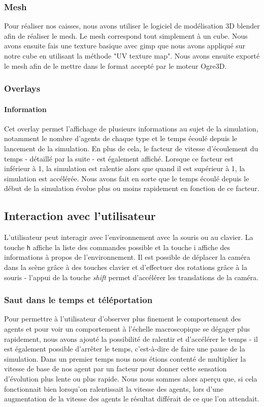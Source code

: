 \subsubsection{Mesh}
Pour réaliser nos caisses, nous avons utiliser le logiciel de modélisation 3D
blender afin de réaliser le mesh. Le mesh correspond tout simplement à un
cube. Nous avons ensuite fais une texture basique avec gimp que nous avons
appliqué sur notre cube en utilisant la méthode "UV texture map".
Nous avons ensuite exporté le mesh afin de le mettre dans le format
accepté par le moteur Ogre3D.


\subsubsection{Overlays}

\paragraph{Information}
Cet overlay permet l'affichage de plusieurs informations au sujet de la
simulation, notamment le nombre d'agents de chaque type et le temps écoulé
depuis le lancement de la simulation.
En plus de cela, le facteur de vitesse d'écoulement du temps - détaillé par la
suite - est également affiché. Lorsque ce facteur est inférieur à 1, la
simulation est ralentie alors que quand il est supérieur à 1, la simulation
est accélérée. Nous avons fait en sorte que le temps écoulé depuis le début de
la simulation évolue plus ou moins rapidement en fonction de ce facteur.

\subsection{Interaction avec l'utilisateur}

L'utilisateur peut interagir avec l'environnement avec la souris ou au
clavier. La touche \verb!h! affiche la liste des commandes possible et la
touche i affiche des informations à propos de l'environnement.
Il est possible de déplacer la caméra dans la scène grâce à des touches
clavier et d'effectuer des rotations grâce à la souris - l'appui de la touche
\emph{shift} permet d'accélérer les translations de la caméra.

\subsubsection{Saut dans le temps et téléportation}
Pour permettre à l'utilisateur d'observer plus finement le comportement des
agents et pour voir un comportement à l'échelle macroscopique se dégager plus
rapidement, nous avons ajouté la possibilité de ralentir et d'accélérer le
temps - il est également possible d'arrêter le temps, c'est-à-dire de faire
une pause de la simulation. Dans un premier temps nous nous étions contenté de
multiplier la vitesse de base de nos agent par un facteur pour donner cette
sensation d'évolution plus lente ou plus rapide. Nous nous sommes alors aperçu
que, si cela fonctionnait bien lorsqu'on ralentissait la vitesse des agents,
lors d'une augmentation de la vitesse des agents le résultat différait de ce
que l'on attendait.

